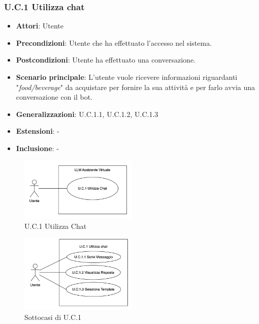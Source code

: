 \subsubsection{U.C.1 Utilizza chat} %
\begin{itemize}
    \item \textbf{Attori}: Utente
    \item \textbf{Precondizioni}: Utente che ha effettuato l'accesso nel sistema.
    \item \textbf{Postcondizioni}: Utente ha effettuato una conversazione.
    \item \textbf{Scenario principale}: L'utente vuole ricevere informazioni riguardanti "\textit{food/beverage}" da acquistare per fornire la sua attività e per farlo avvia una conversazione con il bot.
    \item \textbf{Generalizzazioni}: U.C.1.1, U.C.1.2, U.C.1.3
    \item \textbf{Estensioni}: -
    \item \textbf{Inclusione}: -
\end{itemize}
\begin{figure}[h!]
    \centering
    \includegraphics[width=0.5\textwidth]{img/UC1.png}
    \caption{U.C.1 Utilizza Chat}
\end{figure}
\begin{figure}[h!]
    \centering
    \includegraphics[width=0.5\textwidth]{img/SottocasiUC1.png}
    \caption{Sottocasi di U.C.1}
\end{figure}

